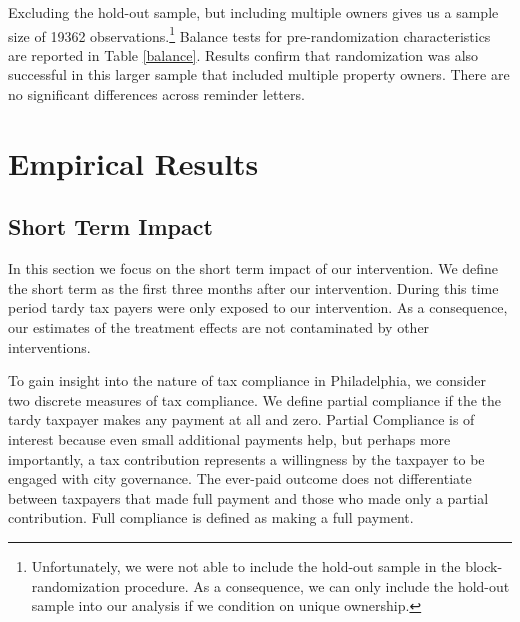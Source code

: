 \documentclass[12pt]{article}
\begin{document}
Excluding the hold-out sample, but including multiple owners gives us
a sample size of 19362 observations.\footnote{Unfortunately, we were
  not able to include the hold-out sample in the block-randomization
  procedure. As a consequence, we can only include the hold-out sample
  into our analysis if we condition on unique ownership.} Balance
tests for pre-randomization characteristics are reported in Table
\ref{balance}.  Results confirm that randomization was also successful
in this larger sample that included multiple property owners.  There
are no significant differences across reminder letters.

\section{Empirical Results}

\subsection{Short Term Impact}

In this section we focus on the short term impact of our
intervention. We define the short term as the first three months after
our intervention. During this time period tardy tax payers were only
exposed to our intervention. As a consequence, our estimates of the
treatment effects are not contaminated by other interventions.

To gain insight into the nature of tax compliance in Philadelphia, we
consider two discrete measures of tax compliance. We define partial
compliance if the the tardy taxpayer makes any payment at all and
zero.  Partial Compliance is of interest because even small additional
payments help, but perhaps more importantly, a tax contribution
represents a willingness by the taxpayer to be engaged with city
governance.  The ever-paid outcome does not differentiate between
taxpayers that made full payment and those who made only a partial
contribution.  Full compliance is defined as making a full payment.
\end{document}
